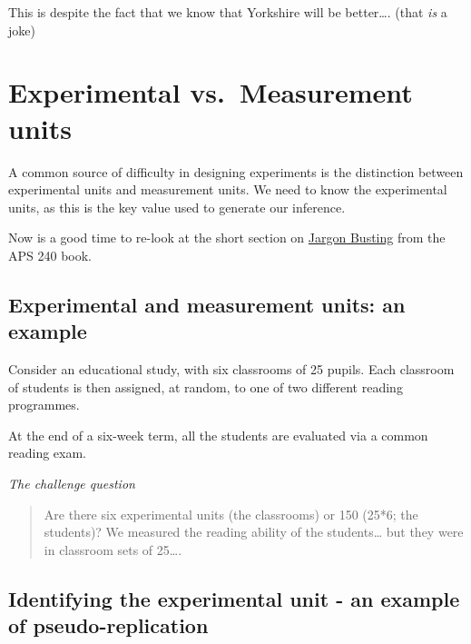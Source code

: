 \documentclass[
]{book}
\begin{document}
This is despite the fact that we know that Yorkshire will be better\ldots. (that \emph{is} a joke)

\hypertarget{experimental-vs.-measurement-units}{%
\section{Experimental vs.~Measurement units}\label{experimental-vs.-measurement-units}}

A common source of difficulty in designing experiments is the distinction between experimental units and measurement units. We need to know the experimental units, as this is the key value used to generate our inference.

Now is a good time to re-look at the short section on \href{https://dzchilds.github.io/stats-for-bio/principles-experimental-design.html\#jargon-busting}{Jargon Busting} from the APS 240 book.

\hypertarget{experimental-and-measurement-units-an-example}{%
\subsection{Experimental and measurement units: an example}\label{experimental-and-measurement-units-an-example}}

Consider an educational study, with six classrooms of 25 pupils. Each classroom of students is then assigned, at random, to one of two different reading programmes.

At the end of a six-week term, all the students are evaluated via a common reading exam.

\emph{The challenge question}

\begin{quote}
Are there six experimental units (the classrooms) or 150 (25*6; the students)? We measured the reading ability of the students\ldots{} but they were in classroom sets of 25\ldots.
\end{quote}

\hypertarget{identifying-the-experimental-unit---an-example-of-pseudo-replication}{%
\subsection{\texorpdfstring{Identifying the experimental unit - an example of \textbf{pseudo-replication}}{Identifying the experimental unit - an example of pseudo-replication}}\label{identifying-the-experimental-unit---an-example-of-pseudo-replication}}
\end{document}

